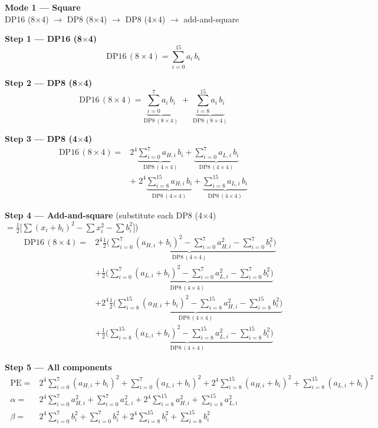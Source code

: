 \documentclass[fleqn]{article}
\newcommand{\DPop}[3]{\mathrm{DP#1}\,(#2\!\times\!#3)}
\begin{document}
\begin{center}
{\LARGE \textbf{Mode 1 --- Square}}\\[4pt]
{\large DP16 (8$\times$4) $\rightarrow$ DP8 (8$\times$4) $\rightarrow$ DP8 (4$\times$4) $\rightarrow$ add-and-square}
\end{center}

\vspace{0.1em}

\textbf{Step 1 --- DP16 (8$\times$4)}
\[
\DPop{16}{8}{4} = \sum_{i=0}^{15} a_i \, b_i
\]

\textbf{Step 2 --- DP8 (8$\times$4)}
\[
\DPop{16}{8}{4}
  = \underbrace{\sum_{i=0}^{7} a_i \, b_i}_{\DPop{8}{8}{4}}
  \; + \; \underbrace{\sum_{i=8}^{15} a_i \, b_i}_{\DPop{8}{8}{4}}
\]

\textbf{Step 3 --- DP8 (4$\times$4)}
\begin{align*}
\DPop{16}{8}{4} = {}
  & 2^{4}\underbrace{\sum_{i=0}^{7} a_{H,i}\,b_i}_{\DPop{8}{4}{4}}
  + \underbrace{\sum_{i=0}^{7} a_{L,i}\,b_i}_{\DPop{8}{4}{4}} \\[0.4em]
  & + \; 2^{4}\underbrace{\sum_{i=8}^{15} a_{H,i}\,b_i}_{\DPop{8}{4}{4}}
  + \underbrace{\sum_{i=8}^{15} a_{L,i}\,b_i}_{\DPop{8}{4}{4}}
\end{align*}

\textbf{Step 4 --- Add-and-square}\quad
{\small(substitute each DP8 (4$\times$4) $= \tfrac{1}{2}\big[\sum(x_i{+}b_i)^2 - \sum x_i^2 - \sum b_i^2\big]$)}
\[
\begin{aligned}
\DPop{16}{8}{4} = {}
  & 2^{4}\underbrace{\tfrac{1}{2}\Big(\sum_{i=0}^{7}(a_{H,i}{+}b_i)^2 - \sum_{i=0}^{7}a_{H,i}^2 - \sum_{i=0}^{7}b_i^2\Big)}_{\DPop{8}{4}{4}} \\[0.8em]
  & + \underbrace{\tfrac{1}{2}\Big(\sum_{i=0}^{7}(a_{L,i}{+}b_i)^2 - \sum_{i=0}^{7}a_{L,i}^2 - \sum_{i=0}^{7}b_i^2\Big)}_{\DPop{8}{4}{4}} \\[0.8em]
  & + 2^{4}\underbrace{\tfrac{1}{2}\Big(\sum_{i=8}^{15}(a_{H,i}{+}b_i)^2 - \sum_{i=8}^{15}a_{H,i}^2 - \sum_{i=8}^{15}b_i^2\Big)}_{\DPop{8}{4}{4}} \\[0.8em]
  & + \underbrace{\tfrac{1}{2}\Big(\sum_{i=8}^{15}(a_{L,i}{+}b_i)^2 - \sum_{i=8}^{15}a_{L,i}^2 - \sum_{i=8}^{15}b_i^2\Big)}_{\DPop{8}{4}{4}}
\end{aligned}
\]

\textbf{Step 5 --- All components}
\[
\boxed{\;
\begin{aligned}
\mathrm{PE} ={}& 2^{4}\sum_{i=0}^{7}(a_{H,i}{+}b_i)^2 + \sum_{i=0}^{7}(a_{L,i}{+}b_i)^2 + 2^{4}\sum_{i=8}^{15}(a_{H,i}{+}b_i)^2 + \sum_{i=8}^{15}(a_{L,i}{+}b_i)^2 \\[0.5em]
\alpha ={}& 2^{4}\sum_{i=0}^{7}a_{H,i}^2 + \sum_{i=0}^{7}a_{L,i}^2 + 2^{4}\sum_{i=8}^{15}a_{H,i}^2 + \sum_{i=8}^{15}a_{L,i}^2 \\[0.5em]
\beta  ={}& 2^{4}\sum_{i=0}^{7}b_i^2 + \sum_{i=0}^{7}b_i^2 + 2^{4}\sum_{i=8}^{15}b_i^2 + \sum_{i=8}^{15}b_i^2
\end{aligned}
\;}
\]
\end{document}
